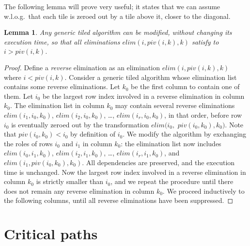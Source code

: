 \documentclass[a4paper,twopages]{article}
\newtheorem{lemma}{Lemma}
\newcommand{\elim}{\mathit{elim}}
\begin{document}
The following lemma will prove very useful; it states that we can assume
w.l.o.g.\ that each tile is zeroed out by a tile above it, closer to the
diagonal.

\begin{lemma}
\label{th.above}
Any generic tiled algorithm can be modified, without changing its
execution time, so that all eliminations $\elim(i, piv(i,k), k)$ satisfy to $i >
piv(i,k)$.
\end{lemma}


\begin{proof}
    Define a \emph{reverse} elimination as an elimination $\elim(i, piv(i,k), k)$
    where $i < piv(i,k)$.  Consider a generic tiled algorithm whose
    elimination list contains some reverse eliminations. Let $k_0$ be the first
    column to contain one of them. Let $i_{0}$ be the largest row index involved in
    a reverse elimination in column $k_0$.  The elimination list in column $k_0$
    may contain several reverse eliminations  $\elim(i_1, i_0, k_0)$, $\elim(i_2,
    i_0, k_0)$, \dots, $\elim(i_r, i_0, k_0)$, in that order, before row $i_0$ is
    eventually zeroed out by the transformation $\elim(i_0,$ $ piv(i_0,k_0), k_0)$.
    Note that $piv(i_0,k_0) < i_0$ by definition of $i_0$.  We modify
    the algorithm by exchanging the roles of rows $i_0$ and $i_1$ in column $k_0$:
    the elimination list now includes $\elim(i_0, i_1, k_0)$, $\elim(i_2, i_1,
    k_0)$, \dots, $\elim(i_r, i_1, k_0)$, and \newline
    $\elim(i_1, piv(i_0,k_0), k_0)$. All
    dependencies are preserved, and the execution time is unchanged. Now the largest
    row index involved in a reverse elimination in column $k_0$ is strictly smaller
    than $i_0$, and we repeat the procedure until there does not remain any reverse
    elimination in column $k_0$. We proceed inductively to the following columns,
    until all reverse eliminations have been suppressed.
\end{proof}


\section{Critical paths}
\label{sec.CP}
\end{document}
